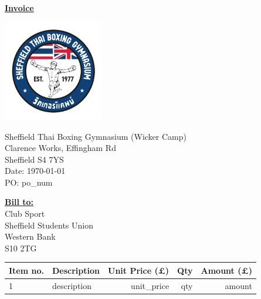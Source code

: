 \documentclass[11pt]{article}
\begin{document}
    \begin{center}
        \Large\textbf{\underline{Invoice}}
    \end{center}

    \noindent
    \includegraphics[width=0.33\textwidth]{../data/logo.jpg}


    \vspace{-2cm} %
    \begin{flushright}
        Sheffield Thai Boxing Gymnasium (Wicker Camp) \\
        Clarence Works, Effingham Rd \\
        Sheffield S4 7YS \\
        Date: \today{} \\
        PO: {{ po_num }}
    \end{flushright}

    \vspace{1cm} %

    \noindent \textbf{\underline{Bill to:}} \\
    Club Sport \\
    Sheffield Students Union \\
    Western Bank \\
    S10 2TG

    \vspace{1cm}

    \begin{longtable}{@{} l p{} r r r @{}}
        \toprule
        \textbf{Item no.} & \raggedright\textbf{Description} & \textbf{Unit Price (£)} & \textbf{Qty} & \textbf{Amount (£)} \\
        \midrule
        \endhead
        1 & {{ description }} & {{ unit_price }} & {{ qty }} & {{ amount }} \\
        \bottomrule
    \end{longtable}
\end{document}
